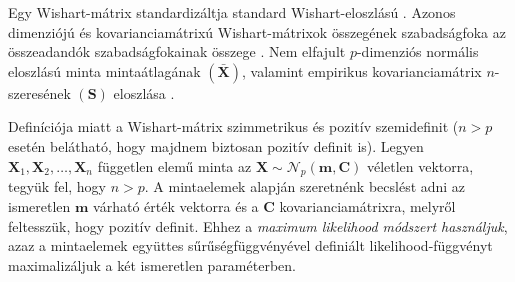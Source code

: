 \documentclass[%
	DIV=15,appendixprefix]{scrreprt}
\theoremstyle{definition}
\theoremstyle{remark}
\newcommand{\normald}{\mathcal{N}}
\begin{document}
Egy Wishart-mátrix standardizáltja standard Wishart-eloszlású \cite[5. fejezet, 4. szakasz, 4.1.
tétel]{BollaKramli}. Azonos dimenziójú és kovarianciamátrixú Wishart-mátrixok összegének
szabadságfoka az összeadandók szabadságfokainak összege \cite[5. fejezet, 4. szakasz, 4.2.
állítás]{BollaKramli}. Nem elfajult $ p $-dimenziós normális eloszlású minta mintaátlagának $ \left(
\bar{ \mathbf{ X } } \right) $, valamint empirikus kovarianciamátrix $ n $-szeresének $ \left(
\mathbf{ S } \right) $ eloszlása \cite[5. fejezet, 4. szakasz, 4.3. tétel]{BollaKramli}.

Definíciója miatt a Wishart-mátrix szimmetrikus és pozitív szemidefinit ($ n > p $ esetén belátható,
hogy majdnem biztosan pozitív definit is).
%
Legyen $ \mathbf{ X }_{ 1 },{} \mathbf{ X }_{ 2 },{} \ldots,{} \mathbf{ X }_{ n } $ független elemű
minta az $ \mathbf{ X } \sim \normald_{ p } \left( \mathbf{ m },{} \mathbf{ C } \right) $ véletlen
vektorra, tegyük fel, hogy $ n > p $. A mintaelemek alapján szeretnénk becslést adni az ismeretlen
$ \mathbf{ m } $ várható érték vektorra és a $ \mathbf{ C } $ kovarianciamátrixra, melyről
feltesszük, hogy pozitív definit. Ehhez a \emph{maximum likelihood módszert használjuk}, azaz a
mintaelemek együttes sűrűségfüggvényével definiált likelihood-függvényt maximalizáljuk a két
ismeretlen paraméterben.
\end{document}
